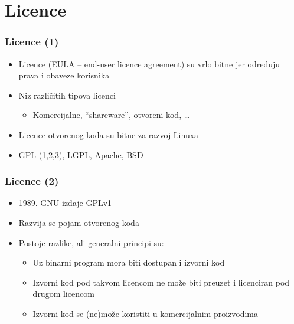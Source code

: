 \documentclass{beamer}
\begin{document}
\section{Licence}
\begin{frame}[t]
\frametitle{Licence (1)}
\begin{itemize}
  \item Licence (EULA -- end-user licence agreement) su vrlo bitne jer
        određuju prava i obaveze korisnika
  \item Niz različitih tipova licenci
  \begin{itemize}
    \item Komercijalne, ``shareware'', otvoreni kod, \ldots
  \end{itemize}
  \item Licence otvorenog koda su bitne za razvoj Linuxa
  \item GPL (1,2,3), LGPL, Apache, BSD
\end{itemize}
\end{frame}

\begin{frame}[t]
\frametitle{Licence (2)}
\begin{itemize}
  \item 1989. GNU izdaje GPLv1
  \item Razvija se pojam otvorenog koda
  \item Postoje razlike, ali generalni principi su:
  \begin{itemize}
    \item Uz binarni program mora biti dostupan i izvorni kod
    \item Izvorni kod pod takvom licencom ne može biti preuzet i 
          licenciran pod drugom licencom
    \item Izvorni kod se (ne)može koristiti u komercijalnim proizvodima
  \end{itemize} 
\end{itemize}
\end{frame}
\end{document}

